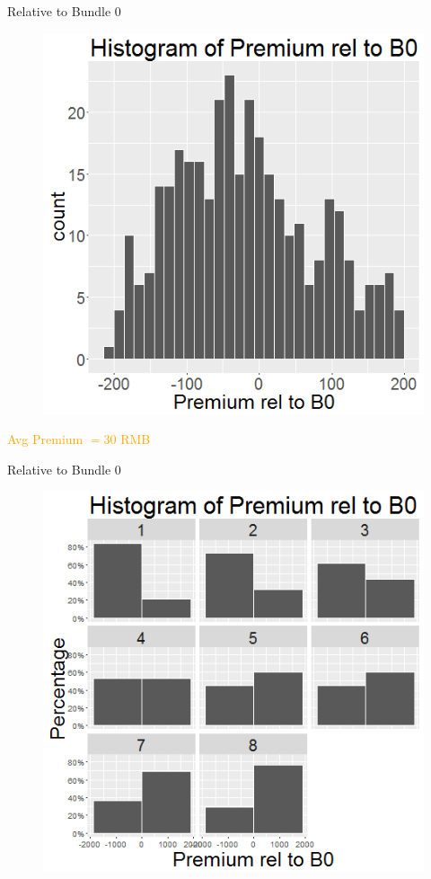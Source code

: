 \documentclass[xcolor=dvipsnames,12pt]{beamer}
\theoremstyle{definition}
\begin{document}
\begin{frame}{Relative to Bundle 0}
\begin{figure}
\graphicspath{ {../../0_relative_to_bundle_0/} }
\includegraphics[scale=0.43]{5_histogram_of_prem_rel_to_b0_zoom_in_}
\end{figure}
\centering
\textcolor{orange}{
{\Huge
Avg Premium $= 30$ RMB}
}
\end{frame}

\begin{frame}{Relative to Bundle 0}
\begin{figure}
\graphicspath{ {../../0_relative_to_bundle_0/} }
\includegraphics[scale=0.43]{3_z_histogram_of_prem_rel_to_b0_2_col_in_num_of_acc_relerent_bundle_index}
\end{figure}
\end{frame}
\end{document}

